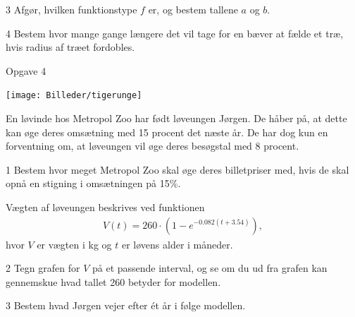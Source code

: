 \documentclass[12pt,x11names,a4paper]{article}
\begin{document}
\begin{delopgave}{}{3}
	Afgør, hvilken funktionstype $f$ er, og bestem tallene $a$ og $b$. 
\end{delopgave}
\begin{delopgave}{}{4}
	Bestem hvor mange gange længere det vil tage for en bæver at fælde et træ, hvis radius af 
	træet fordobles.
\end{delopgave}
\newpage
\begin{opgavetekst}{Opgave 4}
	\begin{center}
		\texttt{[image: Billeder/tigerunge]}
	\end{center}
	En løvinde hos Metropol Zoo har født løveungen Jørgen. De håber på, at dette kan øge
	 deres omsætning med 15 procent det næste år. De har dog kun en forventning
	 om, at løveungen vil øge deres besøgstal med 8 procent. 
\end{opgavetekst}
\begin{delopgave}{}{1}
	Bestem hvor meget Metropol Zoo skal øge deres billetpriser med, hvis de skal opnå en
	stigning i omsætningen på 15$\%$. 
\end{delopgave}
\begin{meretekst}
	Vægten af løveungen beskrives ved funktionen
	\begin{align*}
		V(t) = 260\cdot(1-e^{-0.082(t+3.54)}),
	\end{align*}
	hvor $V$ er vægten i kg og $t$ er løvens alder i måneder. 
\end{meretekst}
%
\begin{delopgave}{}{2}
	Tegn grafen for $V$ på et passende interval, og se om du ud fra grafen kan
	gennemskue hvad tallet 260 betyder for modellen. 
\end{delopgave}
%
\begin{delopgave}{}{3}
	Bestem hvad Jørgen vejer efter ét år i følge modellen.
\end{delopgave}
\end{document}
